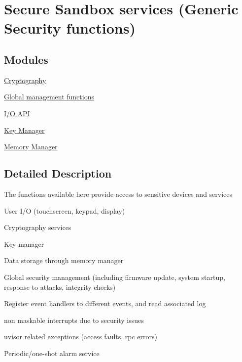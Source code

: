 \hypertarget{group__ssbx}{}\section{Secure Sandbox services (Generic Security functions)}
\label{group__ssbx}
\subsection*{Modules}
\begin{DoxyCompactItemize}
\item 
\hyperlink{group__ssbx___crypto}{Cryptography}
\item 
\hyperlink{group__ssbx___main}{Global management functions}
\item 
\hyperlink{group__ssbx___i_o}{I/\+O A\+PI}
\item 
\hyperlink{group__ssbx___key_management}{Key Manager}
\item 
\hyperlink{group__ssbx___mem}{Memory Manager}
\end{DoxyCompactItemize}


\subsection{Detailed Description}
The functions available here provide access to sensitive devices and services
\begin{DoxyItemize}
\item User I/O (touchscreen, keypad, display)
\item Cryptography services
\item Key manager
\item Data storage through memory manager
\item Global security management (including firmware update, system startup, response to attacks, integrity checks)
\item Register event handlers to different events, and read associated log
\begin{DoxyItemize}
\item non maskable interrupts due to security issues
\item uvisor related exceptions (access faults, rpc errors)
\end{DoxyItemize}
\item Periodic/one-\/shot alarm service
\end{DoxyItemize}

